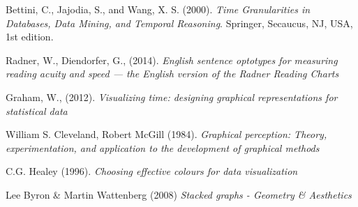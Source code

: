 \documentclass[12pt]{article}
\begin{document}
\begin{thebibliography}{1}
   Bettini, C., Jajodia, S., and Wang, X. S. (2000). {\em Time Granularities in Databases, Data Mining, and Temporal Reasoning}. Springer, Secaucus, NJ, USA, 1st edition.

   Radner, W., Diendorfer, G., (2014). {\em English sentence optotypes for measuring reading acuity and speed --- the English version of the Radner Reading Charts}

   Graham, W., (2012). {\em Visualizing time: designing graphical representations for statistical data}

   William S. Cleveland, Robert McGill (1984). {\em Graphical perception: Theory, experimentation, and application to the development of graphical methods}
  
   C.G. Healey (1996). {\em Choosing effective colours for data visualization}  
  
   Lee Byron \& Martin Wattenberg (2008) {\em Stacked graphs - Geometry \& Aesthetics}
  
  \end{thebibliography}
 
\end{document}
